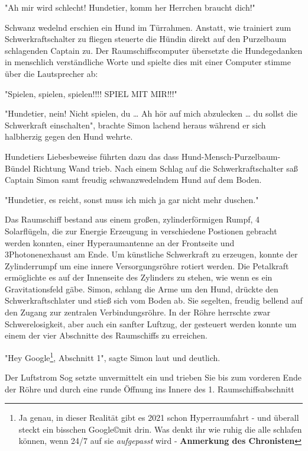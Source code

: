 \documentclass[ebook]{article}
\begin{document}
\begin{center}
"Ah mir wird schlecht! Hundetier, komm her Herrchen braucht dich!"
\end{center}

\noindent Schwanz wedelnd erschien ein Hund im Türrahmen. Anstatt,
wie trainiert zum Schwerkraftschalter zu fliegen steuerte die Hündin
direkt auf den Purzelbaum schlagenden Captain zu. Der
Raumschiffscomputer übersetzte die Hundegedanken in menschlich
verständliche Worte und spielte dies mit einer Computer stimme über
die Lautsprecher ab:

\begin{center}
"Spielen, spielen, spielen!!!! SPIEL MIT MIR!!!"
\end{center}

\begin{center}
"Hundetier, nein! Nicht spielen, du \ldots{} Ah hör auf mich abzulecken
\ldots{} du sollst die Schwerkraft einschalten", brachte Simon lachend
heraus während er sich halbherzig gegen den Hund wehrte.
\end{center}

\noindent Hundetiers Liebesbeweise führten dazu das dass
Hund-Mensch-Purzelbaum-Bündel Richtung Wand trieb. Nach einem Schlag
auf die Schwerkraftschalter saß Captain Simon samt freudig
schwanzwedelndem Hund auf dem Boden.

\begin{center}
"Hundetier, es reicht, sonst muss ich mich ja gar nicht mehr
duschen."
\end{center}

\noindent Das Raumschiff bestand aus einem großen, zylinderförmigen
Rumpf, 4 Solarflügeln, die zur Energie Erzeugung in verschiedene
Postionen gebracht werden konnten, einer Hyperaumantenne an der
Frontseite und 3Photonenexhaust am Ende. Um künstliche Schwerkraft
zu erzeugen, konnte der Zylinderrumpf um eine innere
Versorgungsröhre rotiert werden. Die Petalkraft ermöglichte es auf
der Innenseite des Zylinders zu stehen, wie wenn es ein
Gravitationsfeld gäbe. Simon, schlang die Arme um den Hund, drückte
den Schwerkraftschlater und stieß sich vom Boden ab. Sie segelten,
freudig bellend auf den Zugang zur zentralen Verbindungsröhre. In
der Röhre herrschte zwar Schwerelosigkeit, aber auch ein sanfter
Luftzug, der gesteuert werden konnte um einem der vier Abschnitte
des Raumschiffs zu erreichen.

\begin{center}
"Hey Google\footnote{Ja genau, in dieser Realität gibt es 2021 schon
Hyperraumfahrt - und überall steckt ein bisschen Google\copyright mit
drin. Was denkt ihr wie ruhig die alle schlafen können, wenn 24/7 auf
sie \emph{aufgepasst} wird - \textbf{Anmerkung des Chronisten}}, Abschnitt 1", sagte Simon laut und deutlich.
\end{center}
Der Luftstrom Sog setzte unvermittelt ein und trieben Sie bis zum
vorderen Ende der Röhre und durch eine runde Öffnung ins Innere
des 1. Raumschiffsabschnitt
\end{document}
